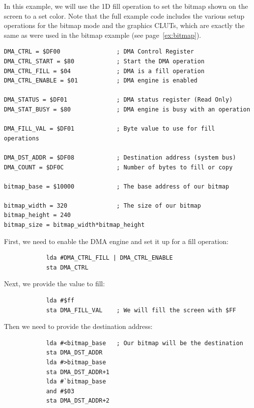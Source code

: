 \label{ex:dma}

In this example, we will use the 1D fill operation to set the bitmap shown on the screen to a set color. Note that the full example code includes the various setup operations for the bitmap mode and the graphics CLUTs, which are exactly the same as were used in the bitmap example (see page~\ref{ex:bitmap}).

\begin{verbatim}
DMA_CTRL = $DF00                ; DMA Control Register
DMA_CTRL_START = $80            ; Start the DMA operation
DMA_CTRL_FILL = $04             ; DMA is a fill operation
DMA_CTRL_ENABLE = $01           ; DMA engine is enabled

DMA_STATUS = $DF01              ; DMA status register (Read Only)
DMA_STAT_BUSY = $80             ; DMA engine is busy with an operation

DMA_FILL_VAL = $DF01            ; Byte value to use for fill operations

DMA_DST_ADDR = $DF08            ; Destination address (system bus)
DMA_COUNT = $DF0C               ; Number of bytes to fill or copy

bitmap_base = $10000            ; The base address of our bitmap

bitmap_width = 320              ; The size of our bitmap
bitmap_height = 240
bitmap_size = bitmap_width*bitmap_height
\end{verbatim}

First, we need to enable the DMA engine and set it up for a fill operation:

\begin{verbatim}
            lda #DMA_CTRL_FILL | DMA_CTRL_ENABLE
            sta DMA_CTRL
\end{verbatim}

Next, we provide the value to fill:

\begin{verbatim}
            lda #$ff
            sta DMA_FILL_VAL    ; We will fill the screen with $FF
\end{verbatim}

Then we need to provide the destination address:

\begin{verbatim}
            lda #<bitmap_base   ; Our bitmap will be the destination
            sta DMA_DST_ADDR
            lda #>bitmap_base
            sta DMA_DST_ADDR+1
            lda #`bitmap_base
            and #$03
            sta DMA_DST_ADDR+2
\end{verbatim}

